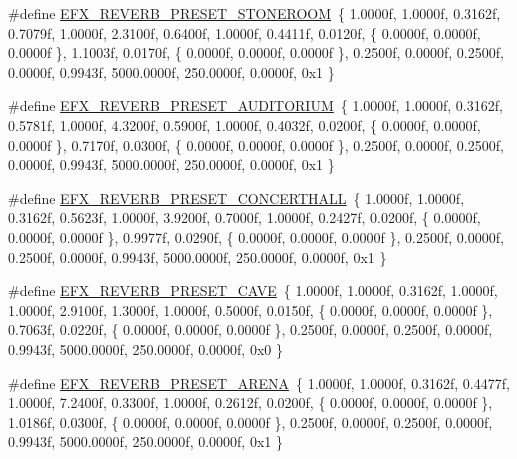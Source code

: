 \begin{DoxyCompactItemize}
\item 
\#define \hyperlink{efx-presets_8h_a0e1d69fafcc43e8837a8e4270665a0ae}{E\+F\+X\+\_\+\+R\+E\+V\+E\+R\+B\+\_\+\+P\+R\+E\+S\+E\+T\+\_\+\+S\+T\+O\+N\+E\+R\+O\+OM}~\{ 1.\+0000f, 1.\+0000f, 0.\+3162f, 0.\+7079f, 1.\+0000f, 2.\+3100f, 0.\+6400f, 1.\+0000f, 0.\+4411f, 0.\+0120f, \{ 0.\+0000f, 0.\+0000f, 0.\+0000f \}, 1.\+1003f, 0.\+0170f, \{ 0.\+0000f, 0.\+0000f, 0.\+0000f \}, 0.\+2500f, 0.\+0000f, 0.\+2500f, 0.\+0000f, 0.\+9943f, 5000.\+0000f, 250.\+0000f, 0.\+0000f, 0x1 \}
\item 
\#define \hyperlink{efx-presets_8h_a1868444b35b1d09cc8438f66cb4ce7a8}{E\+F\+X\+\_\+\+R\+E\+V\+E\+R\+B\+\_\+\+P\+R\+E\+S\+E\+T\+\_\+\+A\+U\+D\+I\+T\+O\+R\+I\+UM}~\{ 1.\+0000f, 1.\+0000f, 0.\+3162f, 0.\+5781f, 1.\+0000f, 4.\+3200f, 0.\+5900f, 1.\+0000f, 0.\+4032f, 0.\+0200f, \{ 0.\+0000f, 0.\+0000f, 0.\+0000f \}, 0.\+7170f, 0.\+0300f, \{ 0.\+0000f, 0.\+0000f, 0.\+0000f \}, 0.\+2500f, 0.\+0000f, 0.\+2500f, 0.\+0000f, 0.\+9943f, 5000.\+0000f, 250.\+0000f, 0.\+0000f, 0x1 \}
\item 
\#define \hyperlink{efx-presets_8h_a56733ee2e8ebe8ef49edcae1a9d5285f}{E\+F\+X\+\_\+\+R\+E\+V\+E\+R\+B\+\_\+\+P\+R\+E\+S\+E\+T\+\_\+\+C\+O\+N\+C\+E\+R\+T\+H\+A\+LL}~\{ 1.\+0000f, 1.\+0000f, 0.\+3162f, 0.\+5623f, 1.\+0000f, 3.\+9200f, 0.\+7000f, 1.\+0000f, 0.\+2427f, 0.\+0200f, \{ 0.\+0000f, 0.\+0000f, 0.\+0000f \}, 0.\+9977f, 0.\+0290f, \{ 0.\+0000f, 0.\+0000f, 0.\+0000f \}, 0.\+2500f, 0.\+0000f, 0.\+2500f, 0.\+0000f, 0.\+9943f, 5000.\+0000f, 250.\+0000f, 0.\+0000f, 0x1 \}
\item 
\#define \hyperlink{efx-presets_8h_a0ca71faa4923155557a0b9a8c5227775}{E\+F\+X\+\_\+\+R\+E\+V\+E\+R\+B\+\_\+\+P\+R\+E\+S\+E\+T\+\_\+\+C\+A\+VE}~\{ 1.\+0000f, 1.\+0000f, 0.\+3162f, 1.\+0000f, 1.\+0000f, 2.\+9100f, 1.\+3000f, 1.\+0000f, 0.\+5000f, 0.\+0150f, \{ 0.\+0000f, 0.\+0000f, 0.\+0000f \}, 0.\+7063f, 0.\+0220f, \{ 0.\+0000f, 0.\+0000f, 0.\+0000f \}, 0.\+2500f, 0.\+0000f, 0.\+2500f, 0.\+0000f, 0.\+9943f, 5000.\+0000f, 250.\+0000f, 0.\+0000f, 0x0 \}
\item 
\#define \hyperlink{efx-presets_8h_a80a8de17793714c91369357ba370843d}{E\+F\+X\+\_\+\+R\+E\+V\+E\+R\+B\+\_\+\+P\+R\+E\+S\+E\+T\+\_\+\+A\+R\+E\+NA}~\{ 1.\+0000f, 1.\+0000f, 0.\+3162f, 0.\+4477f, 1.\+0000f, 7.\+2400f, 0.\+3300f, 1.\+0000f, 0.\+2612f, 0.\+0200f, \{ 0.\+0000f, 0.\+0000f, 0.\+0000f \}, 1.\+0186f, 0.\+0300f, \{ 0.\+0000f, 0.\+0000f, 0.\+0000f \}, 0.\+2500f, 0.\+0000f, 0.\+2500f, 0.\+0000f, 0.\+9943f, 5000.\+0000f, 250.\+0000f, 0.\+0000f, 0x1 \}
\item 

\end{DoxyCompactItemize}
